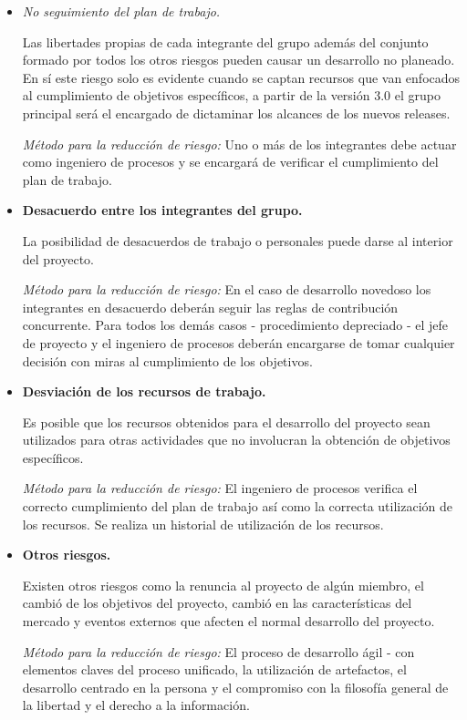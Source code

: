 \begin{itemize}
\item \textit{No seguimiento del plan de trabajo.} 

Las libertades propias de cada integrante del grupo además del conjunto formado por todos los otros riesgos pueden causar un desarrollo no planeado. En sí este riesgo solo es evidente cuando se captan recursos que van enfocados al cumplimiento de objetivos específicos, a partir de la versión 3.0 el grupo principal será el encargado de dictaminar los alcances de los nuevos releases.

\textit{Método para la reducción de riesgo:}  Uno o más de los integrantes debe actuar como ingeniero de procesos y se encargará de verificar el cumplimiento del plan de trabajo.

\item \textbf{Desacuerdo entre los integrantes del grupo.} 

La posibilidad de desacuerdos de trabajo o personales puede darse al interior del proyecto. 

\textit{Método para la reducción de riesgo:} En el caso de desarrollo novedoso los integrantes en desacuerdo deberán seguir las reglas de contribución concurrente. Para todos los demás casos - procedimiento depreciado - el jefe de proyecto y el ingeniero de procesos deberán encargarse de tomar cualquier decisión con miras al cumplimiento de los objetivos.

\item \textbf{Desviación de los recursos de trabajo.} 

Es posible que los recursos obtenidos para el desarrollo del proyecto sean utilizados para otras actividades que no involucran la obtención de objetivos específicos.

\textit{Método para la reducción de riesgo:}  El ingeniero de procesos verifica el correcto cumplimiento del plan de trabajo así como la correcta utilización de los recursos.  Se realiza un historial de utilización de los recursos.

\item \textbf{Otros riesgos.} 

Existen otros riesgos como la renuncia al proyecto de algún miembro, el cambió de los objetivos del proyecto, cambió en las características del mercado y eventos externos que afecten el normal desarrollo del proyecto.

\textit{Método para la reducción de riesgo:}  El proceso de desarrollo ágil - con elementos claves del proceso unificado, la utilización de artefactos, el desarrollo centrado en la persona y el compromiso con la filosofía general de la libertad y el derecho a la información.
\end{itemize}


